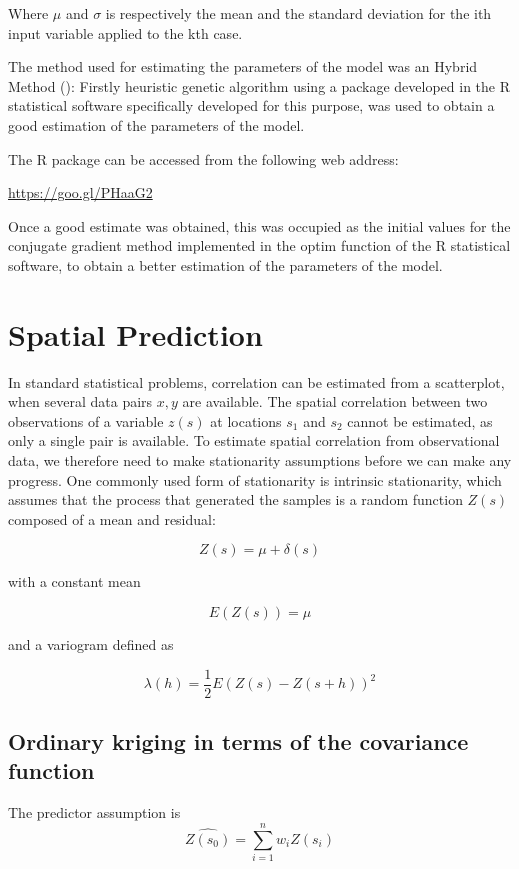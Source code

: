\documentclass[11pt,twoside]{rmta2010esp}%
\begin{document}
Where $ \mu $ and $\sigma$  is respectively the mean and the standard deviation for the ith input variable applied to the kth case.  

The method used for estimating the parameters of the model was an Hybrid Method (\cite{McNelis2005}): Firstly heuristic genetic algorithm using a package developed in the R statistical software specifically developed for this purpose, was used to obtain 
a good estimation of the parameters of the model. 

The R package can be accessed from the following web address:
 
\url{https://goo.gl/PHaaG2}


Once a good estimate was obtained, this was occupied as the initial values for the conjugate gradient method implemented in the optim function of the R statistical software, to obtain a better estimation of the parameters of the model.  


\section{Spatial Prediction}
In standard statistical problems, correlation can be estimated from a scatterplot, when several data pairs ${x, y}$ are available. The spatial correlation between two observations of a variable $z(s)$ at locations $s_{1}$ and $s_{2}$ cannot be estimated, as only a single pair is available. To estimate spatial correlation
from observational data, we therefore need to make stationarity assumptions
before we can make any progress. One commonly used form of stationarity
is intrinsic stationarity, which assumes that the process that generated the
samples is a random function $Z(s)$ composed of a mean and residual:

\begin{equation}
Z(s) = \mu + \delta(s)
\end{equation}

with a constant mean 

\begin{equation}
E\left(Z(s)\right) = \mu
\end{equation}

and a variogram defined as 

\begin{equation}
\lambda(h) = \frac{1}{2}E\left(Z(s) - Z(s+h)\right)^{2}
\end{equation}


\subsection*{Ordinary kriging in terms of the covariance function}
The predictor assumption is 
\begin{equation}
\hat{Z(s_{0})} = \sum_{i=1}^{n} w_{i}Z(s_{i})
\end{equation}
\end{document}
